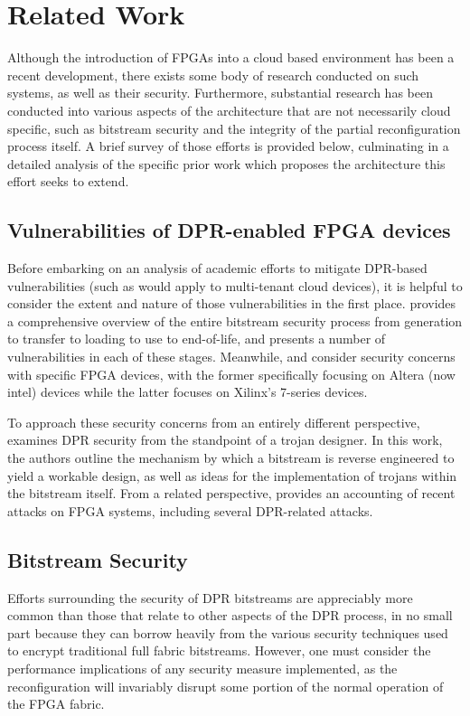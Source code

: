 
\chapter{Related Work}\label{ch:relatedWork}
Although the introduction of FPGAs into a cloud based environment has been a recent development, there exists some body of research conducted on such systems, as well as their security. Furthermore, substantial research has been conducted into various aspects of the architecture that are not necessarily cloud specific, such as bitstream security and the integrity of the partial reconfiguration process itself. A brief survey of those efforts is provided below, culminating in a detailed analysis of the specific prior work which proposes the architecture this effort seeks to extend.

\section{Vulnerabilities of DPR-enabled FPGA devices} \label{sec:vulnerabilities}
Before embarking on an analysis of academic efforts to mitigate DPR-based vulnerabilities (such as would apply to multi-tenant cloud devices), it is helpful to consider the extent and nature of those vulnerabilities in the first place. \cite{duncan_fpga_2019} provides a comprehensive overview of the entire bitstream security process from generation to transfer to loading to use to end-of-life, and presents a number of vulnerabilities in each of these stages. Meanwhile, \cite{swierczynski_physical_2014} and \cite{ender_unpatchable_2020} consider security concerns with specific FPGA devices, with the former specifically focusing on Altera (now intel) devices while the latter focuses on Xilinx's 7-series devices.

To approach these security concerns from an entirely different perspective, \cite{ender_insights_2019} examines DPR security from the standpoint of a trojan designer. In this work, the authors outline the mechanism by which a bitstream is reverse engineered to yield a workable design, as well as ideas for the implementation of trojans within the bitstream itself. From a related perspective, \cite{zhang_recent_2019} provides an accounting of recent attacks on FPGA systems, including several DPR-related attacks.

\section{Bitstream Security} \label{sec:bitstreamSecurity}
Efforts surrounding the security of DPR bitstreams are appreciably more common than those that relate to other aspects of the DPR process, in no small part because they can borrow heavily from the various security techniques used to encrypt traditional full fabric bitstreams. However, one must consider the performance implications of any security measure implemented, as the reconfiguration will invariably disrupt some portion of the normal operation of the FPGA fabric.


